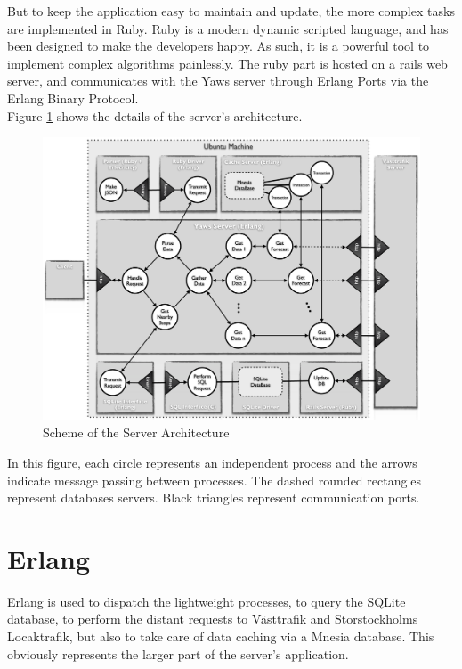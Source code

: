 But to keep the application easy to maintain and update, the more complex tasks are implemented in Ruby. Ruby is a modern dynamic scripted language, and has been designed to make the developers happy. As such, it is a powerful tool to implement complex algorithms painlessly. The ruby part is hosted on a rails web server, and communicates with the Yaws server through Erlang Ports via the Erlang Binary Protocol.\\

Figure \ref{fig:server_architecture} shows the details of the server's architecture.\\

\begin{figure}[ht]
\center
\includegraphics[scale=0.4]{pics/server_side}
\caption{Scheme of the Server Architecture}
\label{fig:server_architecture}
\end{figure}

In this figure, each circle represents an independent process and the arrows indicate message passing between processes. The dashed rounded rectangles represent databases servers. Black triangles represent communication ports.

\clearpage
\section{Erlang}

Erlang is used to dispatch the lightweight processes, to query the SQLite database, to perform the distant requests to Västtrafik and Storstockholms Locaktrafik, but also to take care of data caching via a Mnesia database. This obviously represents the larger part of the server's application.\\


